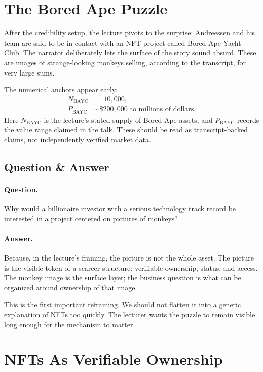 \section{The Bored Ape Puzzle}

After the credibility setup, the lecture pivots to the surprise: Andreessen and his team are said to be in contact with an NFT project called Bored Ape Yacht Club. The narrator deliberately lets the surface of the story sound absurd. These are images of strange-looking monkeys selling, according to the transcript, for very large sums.

The numerical anchors appear early:
\begin{align}
N_{\mathrm{BAYC}} &= 10{,}000, \\
P_{\mathrm{BAYC}} &\sim \$200{,}000 \text{ to millions of dollars}.
\end{align}
Here \(N_{\mathrm{BAYC}}\) is the lecture's stated supply of Bored Ape assets, and \(P_{\mathrm{BAYC}}\) records the value range claimed in the talk. These should be read as transcript-backed claims, not independently verified market data.

\subsection{Question \& Answer}

\paragraph{Question.}
Why would a billionaire investor with a serious technology track record be interested in a project centered on pictures of monkeys?

\paragraph{Answer.}
Because, in the lecture's framing, the picture is not the whole asset. The picture is the visible token of a scarcer structure: verifiable ownership, status, and access. The monkey image is the surface layer; the business question is what can be organized around ownership of that image.

This is the first important reframing. We should not flatten it into a generic explanation of NFTs too quickly. The lecturer wants the puzzle to remain visible long enough for the mechanism to matter.

\section{NFTs As Verifiable Ownership}


